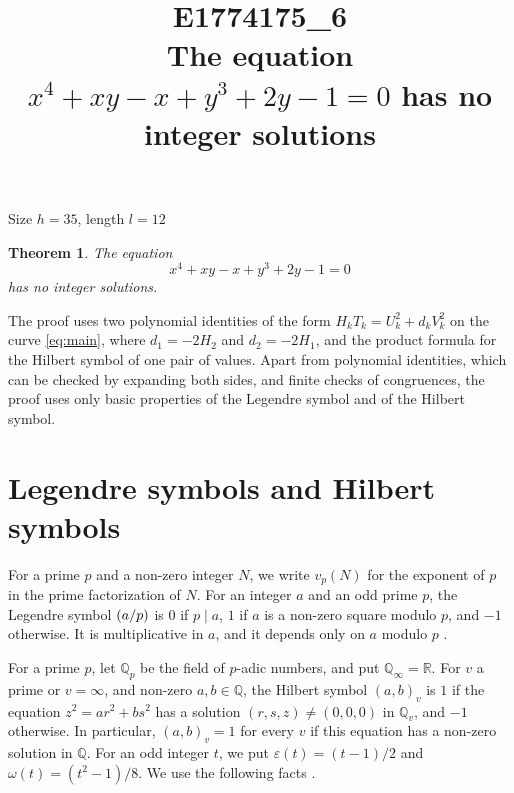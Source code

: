 \documentclass[11pt]{article}
\title{\textbf{E1774175\_6}\\[4pt] {\Large The equation $x^{4}+xy-x+y^{3}+2y-1=0$ has no integer solutions}}
\author{}
\date{}
\newtheorem{theorem}{Theorem}
\newcommand{\Q}{\mathbb{Q}}
\newcommand{\leg}[2]{\mathchoice{\biggl(\dfrac{#1}{#2}\biggr)}{(#1/#2)}{(#1/#2)}{(#1/#2)}}
\begin{document}
\maketitle
\vspace{-8ex}
\begin{center}
Size $h=35$, length $l=12$
\end{center}

\begin{theorem}\label{thm:main}
The equation
\begin{equation}\label{eq:main}
x^{4}+xy-x+y^{3}+2y-1=0
\end{equation}
has no integer solutions.
\end{theorem}

The proof uses two polynomial identities of the form $H_kT_k=U_k^2+d_kV_k^2$ on the curve \eqref{eq:main}, where $d_{1}=-2H_{2}$ and $d_{2}=-2H_{1}$, and the product formula for the Hilbert symbol of one pair of values. Apart from polynomial identities, which can be checked by expanding both sides, and finite checks of congruences, the proof uses only basic properties of the Legendre symbol and of the Hilbert symbol.

\section{Legendre symbols and Hilbert symbols}

For a prime $p$ and a non-zero integer $N$, we write $v_p(N)$ for the exponent of $p$ in the prime factorization of $N$. For an integer $a$ and an odd prime $p$, the Legendre symbol $\leg{a}{p}$ is $0$ if $p\mid a$, $1$ if $a$ is a non-zero square modulo $p$, and $-1$ otherwise. It is multiplicative in $a$, and it depends only on $a$ modulo $p$ \cite[Chapter~5]{IR}.

For a prime $p$, let $\Q_p$ be the field of $p$-adic numbers, and put $\Q_\infty=\mathbb R$. For $v$ a prime or $v=\infty$, and non-zero $a,b\in\Q$, the Hilbert symbol $(a,b)_v$ is $1$ if the equation $z^2=ar^2+bs^2$ has a solution $(r,s,z)\neq(0,0,0)$ in $\Q_v$, and $-1$ otherwise. In particular, $(a,b)_v=1$ for every $v$ if this equation has a non-zero solution in $\Q$. For an odd integer $t$, we put $\varepsilon(t)=(t-1)/2$ and $\omega(t)=(t^2-1)/8$. We use the following facts \cite[Chapter~III, Proposition~2 and Theorems~1 and~3]{Se}.
\end{document}
